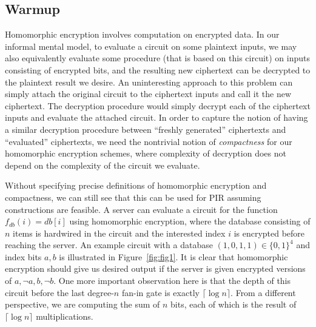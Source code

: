 \documentclass[11pt]{article}
\begin{document}
\subsection{Warmup}
Homomorphic encryption involves computation on encrypted data. In our informal mental model, to evaluate a circuit on some plaintext inputs, we may also equivalently evaluate some procedure (that is based on this circuit) on inputs consisting of encrypted bits, and the resulting new ciphertext can be decrypted to the plaintext result we desire. An uninteresting approach to this problem can simply attach the original circuit to the ciphertext inputs and call it the new ciphertext. The decryption procedure would simply decrypt each of the ciphertext inputs and evaluate the attached circuit. In order to capture the notion of having a similar decryption procedure between ``freshly generated'' ciphertexts and ``evaluated'' ciphertexts, we need the nontrivial notion of \textit{compactness} for our homomorphic encryption schemes, where complexity of decryption does not depend on the complexity of the circuit we evaluate.

Without specifying precise definitions of homomorphic encryption and compactness, we can still see that this can be used for PIR assuming constructions are feasible. A server can evaluate a circuit for the function $f_{db}(i) = db[i]$ using homomorphic encryption, where the database consisting of $n$ items is hardwired in the circuit and the interested index $i$ is encrypted before reaching the server. An example circuit with a database $(1,0,1,1) \in \{0,1\}^4$ and index bits $a,b$ is illustrated in Figure~\ref{fig:fig1}. It is clear that homomorphic encryption should give us desired output if the server is given encrypted versions of $a, \lnot a, b, \lnot b$. One more important observation here is that the depth of this circuit before the last degree-$n$ fan-in gate is exactly $\lceil \log n \rceil$. From a different perspective, we are computing the sum of $n$ bits, each of which is the result of $\lceil \log n \rceil$ multiplications. 
\end{document}
